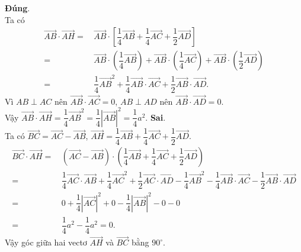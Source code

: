 \begin{ex}
{\begin{itemchoice}
\itemch \textbf{Đúng}.\\
Ta có
\begin{align*}
\overrightarrow{AB}\cdot \overrightarrow{AH}
=&\, \overrightarrow{AB}\cdot \left[ \dfrac{1}{4}\overrightarrow{AB}+\dfrac{1}{4}\overrightarrow{AC}+\dfrac{1}{2}\overrightarrow{AD} \right]\\
=&\, \overrightarrow{AB}\cdot \left(\dfrac{1}{4}\overrightarrow{AB} \right)+\overrightarrow{AB}\cdot \left(\dfrac{1}{4}\overrightarrow{AC} \right)+\overrightarrow{AB}\cdot \left(\dfrac{1}{2}\overrightarrow{AD} \right)\\ =&\, \dfrac{1}{4}{{\overrightarrow{AB}}^2}+\dfrac{1}{4}\overrightarrow{AB}\cdot \overrightarrow{AC}+\dfrac{1}{2}\overrightarrow{AB}\cdot \overrightarrow{AD}.
\end{align*}
Vì $AB\perp AC$ nên $\overrightarrow{AB}\cdot \overrightarrow{AC}=0$, $AB\perp AD$ nên $\overrightarrow{AB}\cdot \overrightarrow{AD}=0$.\\
Vậy $\overrightarrow{AB}\cdot \overrightarrow{AH}=\dfrac{1}{4}{{\overrightarrow{AB}}^2}=\dfrac{1}{4}{\left| \overrightarrow{AB} \right|^2}=\dfrac{1}{4}a^2$.
\itemch \textbf{Sai}.\\
Ta có $\overrightarrow{BC}=\overrightarrow{AC}-\overrightarrow{AB}$, $\overrightarrow{AH}=\dfrac{1}{4}\overrightarrow{AB}+\dfrac{1}{4}\overrightarrow{AC}+\dfrac{1}{2}\overrightarrow{AD}$.\\
\begin{align*}
\overrightarrow{BC}\cdot \overrightarrow{AH}=&\, \left(\overrightarrow{AC}-\overrightarrow{AB} \right)\cdot \left(\dfrac{1}{4}\overrightarrow{AB}+\dfrac{1}{4}\overrightarrow{AC}+\dfrac{1}{2}\overrightarrow{AD} \right)\\
=&\, \dfrac{1}{4}\overrightarrow{AC}\cdot \overrightarrow{AB}+\dfrac{1}{4}{\overrightarrow{AC}}^2+\dfrac{1}{2}\overrightarrow{AC}\cdot \overrightarrow{AD}-\dfrac{1}{4}{\overrightarrow{AB}}^2-\dfrac{1}{4}\overrightarrow{AB}\cdot \overrightarrow{AC}-\dfrac{1}{2}\overrightarrow{AB}\cdot \overrightarrow{AD} \\
=&\, 0+\dfrac{1}{4}\left| \overrightarrow{AC} \right|^2+0-\dfrac{1}{4}\left| \overrightarrow{AB} \right|^2-0-0\\
=&\, \dfrac{1}{4}a^2-\dfrac{1}{4}a^2=0.
\end{align*} 
Vậy góc giữa hai vectơ $\overrightarrow{AH}$ và $\overrightarrow{BC}$ bằng $90^\circ $.
\end{itemchoice}
}
\end{ex}

